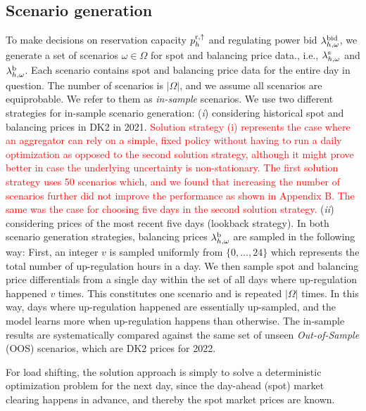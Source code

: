 \documentclass[11pt,a4paper]{article}
\begin{document}
\subsection{Scenario generation}\label{sec:scenario_generation}
To make decisions on reservation capacity $p_{h}^{\rm{r},\uparrow}$ and regulating power bid $\lambda_{h,\omega}^{\rm{bid}}$, we generate a set of scenarios $\omega \in \Omega$ for spot and balancing price data., i.e., $ \lambda_{h,\omega}^{\rm{s}}$ and $ \lambda_{h,\omega}^{\rm{b}}$. Each scenario contains spot and balancing price data for the entire day in question. The number of scenarios is $|\Omega|$, and we assume all scenarios are equiprobable. We refer to them as \textit{in-sample} scenarios. We use two different strategies for in-sample scenario generation: (\textit{i}) considering historical spot and balancing prices in DK2 in 2021. \textcolor{red}{Solution strategy (i) represents the case where an aggregator can rely on a simple, fixed policy without having to run a daily optimization as opposed to the second solution strategy, although it might prove better in case the underlying uncertainty is non-stationary. The first solution strategy uses 50 scenarios which, and we found that increasing the number of scenarios further did not improve the performance as shown in Appendix B. The same was the case for choosing five days in the second solution strategy.}
(\textit{ii}) considering prices of the most recent five days (lookback strategy). In both scenario generation strategies, balancing prices $\lambda_{h,\omega}^{\rm{b}}$ are sampled in the following way: First, an integer $v$ is sampled uniformly from $\{0, \ldots, 24\}$ which represents the total number of up-regulation hours in a day. We then sample spot and balancing price differentials from a single day within the set of all days where up-regulation happened $v$ times. This constitutes one scenario and is repeated $|\Omega|$ times. In this way, days where up-regulation happened are essentially up-sampled, and the model learns more when up-regulation happens than otherwise. The in-sample results are systematically compared against the same set of unseen \textit{Out-of-Sample} (OOS) scenarios, which are DK2 prices for 2022.

For load shifting, the solution approach is simply to solve a deterministic optimization problem for the next day, since the day-ahead (spot) market clearing happens in advance, and thereby the spot market prices are known.
\end{document}
